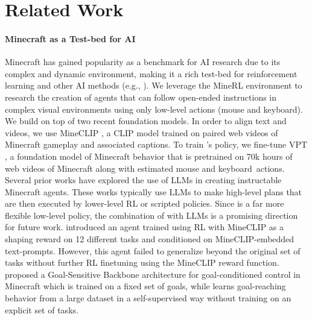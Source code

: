 \section{Related Work}

\paragraph{Minecraft as a Test-bed for AI}
Minecraft has gained popularity as a benchmark for AI research due to its complex and dynamic environment, making it a rich test-bed for reinforcement learning and other AI methods (e.g., \citep{johnson2016malmo, guss2019minerl,fan2022minedojo, hafner2023dreamerv3,nottingham2023embodied, wang2023describe,malato2022behavioral,cai2023open}). We leverage the MineRL environment \citep{guss2019minerl} to research the creation of agents that can follow open-ended instructions in complex visual environments using only low-level actions (mouse and keyboard). We build \agentname{} on top of two recent foundation models. In order to align text and videos, we use MineCLIP \citep{fan2022minedojo}, a CLIP \citep{radford2021clip} model trained on paired web videos of Minecraft gameplay and associated captions. To train \agentname{}'s policy, we fine-tune VPT \citep{baker2022vpt}, a foundation model of Minecraft behavior that is pretrained on 70k hours of web videos of Minecraft along with estimated mouse and keyboard~actions. Several prior works \citep{volum-etal-2022-craft, wang2023describe} have explored the use of LLMs in creating instructable Minecraft agents. These works typically use LLMs to make high-level plans that are then executed by lower-level RL \citep{nottingham2023embodied, wang2023describe} or scripted \citep{PrismarineJS2023} policies. Since \agentname{} is a far more flexible low-level policy, the combination of \agentname{} with LLMs is a promising direction for future work. \citet{fan2022minedojo} introduced an agent trained using RL with MineCLIP as a shaping reward on 12 different tasks and conditioned on MineCLIP-embedded text-prompts. However, this agent failed to generalize beyond the original set of tasks without further RL finetuning using the MineCLIP reward function. \citet{cai2023open} proposed a Goal-Sensitive Backbone architecture for goal-conditioned control in Minecraft which is trained on a fixed set of goals, while \agentname{} learns goal-reaching behavior from a large dataset in a self-supervised way without training on an explicit set of tasks.


